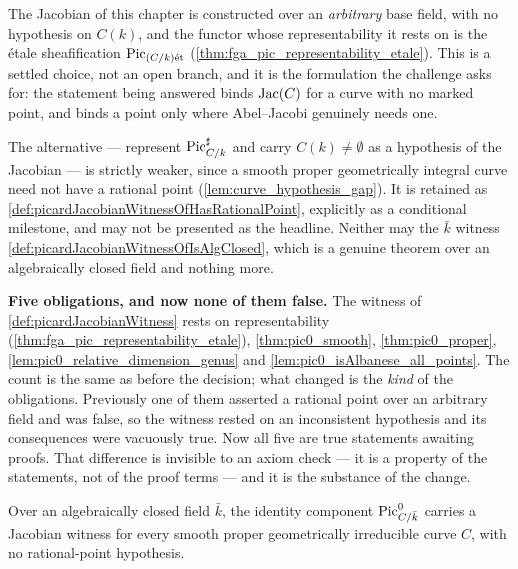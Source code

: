 \begin{remark}
  \label{rem:rational_point_scope}
  The Jacobian of this chapter is constructed over an \emph{arbitrary} base field, with no
  hypothesis on \(C(k)\), and the functor whose representability it rests on is the
  \'etale sheafification \(\operatorname{Pic}_{(C/k)\mathrm{\acute{e}t}}\)
  (\cref{thm:fga_pic_representability_etale}). This is a settled choice, not an open
  branch, and it is the formulation the challenge asks for: the statement being answered
  binds \(\mathrm{Jac}(C)\) for a curve with no marked point, and binds a point only where
  Abel--Jacobi genuinely needs one.

  The alternative --- represent \(\operatorname{Pic}^\sharp_{C/k}\) and carry
  \(C(k) \neq \emptyset\) as a hypothesis of the Jacobian --- is strictly weaker, since a
  smooth proper geometrically integral curve need not have a rational point
  (\cref{lem:curve_hypothesis_gap}). It is retained as
  \cref{def:picardJacobianWitnessOfHasRationalPoint}, explicitly as a conditional
  milestone, and may not be presented as the headline. Neither may the \(\bar k\) witness
  \cref{def:picardJacobianWitnessOfIsAlgClosed}, which is a genuine theorem over an
  algebraically closed field and nothing more.

  \textbf{Five obligations, and now none of them false.} The witness of
  \cref{def:picardJacobianWitness} rests on representability
  (\cref{thm:fga_pic_representability_etale}), \cref{thm:pic0_smooth},
  \cref{thm:pic0_proper}, \cref{lem:pic0_relative_dimension_genus} and
  \cref{lem:pic0_isAlbanese_all_points}. The count is the same as before the decision;
  what changed is the \emph{kind} of the obligations. Previously one of them asserted a
  rational point over an arbitrary field and was false, so the witness rested on an
  inconsistent hypothesis and its consequences were vacuously true. Now all five are true
  statements awaiting proofs. That difference is invisible to an axiom check --- it is a
  property of the statements, not of the proof terms --- and it is the substance of the
  change.
\end{remark}

\begin{theorem}
  \label{def:picardJacobianWitnessOfIsAlgClosed}
  Over an algebraically closed field \(\bar k\), the identity component
  \(\operatorname{Pic}^0_{C/\bar k}\) carries a Jacobian witness for every smooth proper
  geometrically irreducible curve \(C\), with no rational-point hypothesis.
\end{theorem}

